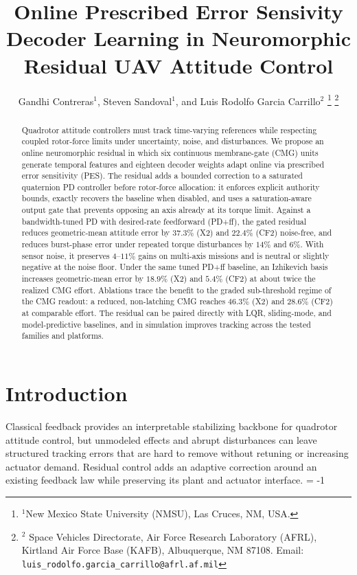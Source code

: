 \documentclass[letterpaper, 10 pt, conference]{ieeeconf}
\title{\LARGE \bf Online Prescribed Error Sensivity Decoder Learning in Neuromorphic Residual UAV Attitude Control}
\author{Gandhi Contreras$^{1}$, Steven Sandoval$^{1}$, and Luis Rodolfo Garcia Carrillo$^{2}$%
\thanks{$^{1}$New Mexico State University (NMSU), Las Cruces, NM, USA.}%
\thanks{$^{2}$ Space Vehicles Directorate, Air Force Research Laboratory (AFRL), Kirtland Air Force Base (KAFB), Albuquerque, NM 87108.
    Email: {\tt\small luis\_rodolfo.garcia\_carrillo@afrl.af.mil}}%
}
\begin{document}
\maketitle



\begin{abstract}
Quadrotor attitude controllers must track time-varying references while respecting coupled rotor-force limits under uncertainty, noise, and disturbances. We propose an online neuromorphic residual in which six continuous membrane-gate (CMG) units generate temporal features and eighteen decoder weights adapt online via prescribed error sensitivity (PES).
%
The residual adds a bounded correction to a saturated quaternion PD controller before rotor-force allocation: it enforces explicit authority bounds, exactly recovers the baseline when disabled, and uses a saturation-aware output gate that prevents opposing an axis already at its torque limit.
%
Against a bandwidth-tuned PD with desired-rate feedforward (PD+ff), the gated residual reduces geometric-mean attitude error by $37.3\%$ (X2) and $22.4\%$ (CF2) noise-free, and reduces burst-phase error under repeated torque disturbances by $14\%$ and $6\%$. With sensor noise, it preserves $4$--$11\%$ gains on multi-axis missions and is neutral or slightly negative at the noise floor.
Under the same tuned PD+ff baseline, an Izhikevich basis increases geometric-mean error by $18.9\%$ (X2) and $5.4\%$ (CF2) at about twice the realized CMG effort.
Ablations trace the benefit to the graded sub-threshold regime of the CMG readout: a reduced, non-latching CMG reaches $46.3\%$ (X2) and $28.6\%$ (CF2) at comparable effort.
The residual can be paired directly with LQR, sliding-mode, and model-predictive baselines, and in simulation improves tracking across the tested families and platforms.
\end{abstract}


\section{Introduction}
Classical feedback provides an interpretable stabilizing backbone for quadrotor attitude control, but unmodeled effects and abrupt disturbances can leave structured tracking errors that are hard to remove without retuning or increasing actuator demand. Residual control adds an adaptive correction around an existing feedback law while preserving its plant and actuator interface. \looseness = -1
\end{document}
